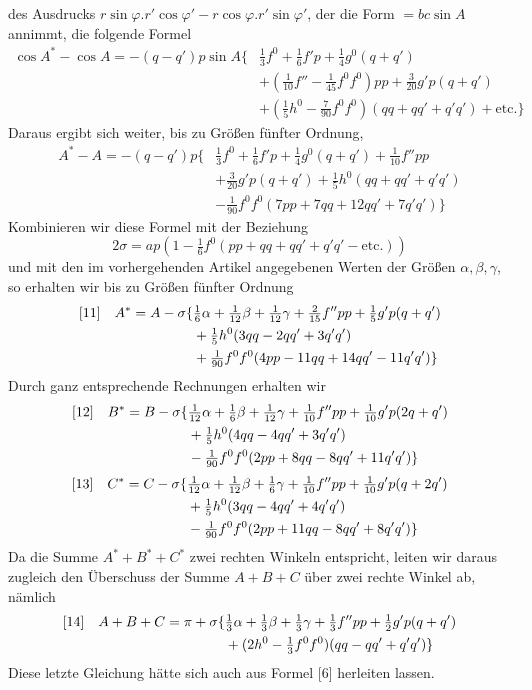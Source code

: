 %
des Ausdrucks \(r\sin\varphi\mathord{.}r'\cos\varphi'-r\cos\varphi\mathord{.}r'\sin\varphi'\), der die Form \(=bc\sin A\) annimmt, die folgende Formel
\[
\begin{aligned}
\cos A^*-\cos A=-(q-q')p\sin A\{&\tfrac{1}{3}f^0+\tfrac{1}{6}f'p+\tfrac{1}{4}g^0(q+q')\\
&+(\tfrac{1}{10}f''-\tfrac{1}{45}f^0f^0)pp+\tfrac{3}{20}g'p(q+q')\\
&+(\tfrac{1}{5}h^0-\tfrac{7}{90}f^0f^0)(qq+qq'+q'q')+\text{etc.}\}
\end{aligned}
\]
Daraus ergibt sich weiter, bis zu Größen fünfter Ordnung,
\[
\begin{aligned}
A^*-A=-(q-q')p\{&\tfrac{1}{3}f^0+\tfrac{1}{6}f'p+\tfrac{1}{4}g^0(q+q')+\tfrac{1}{10}f''pp\\
&+\tfrac{3}{20}g'p(q+q')+\tfrac{1}{5}h^0(qq+qq'+q'q')\\
&-\tfrac{1}{90}f^0f^0(7pp+7qq+12qq'+7q'q')\}
\end{aligned}
\]
Kombinieren wir diese Formel mit der Beziehung
\[
2\sigma=ap(1-\tfrac{1}{6}f^0(pp+qq+qq'+q'q'-\text{etc.}))
\]
und mit den im vorhergehenden Artikel angegebenen Werten der Größen \(\alpha,\beta,\gamma\), so erhalten wir bis zu Größen fünfter Ordnung
\[
\begin{aligned}
\relax[11]\quad A^*=A-\sigma\{&\tfrac{1}{6}\alpha+\tfrac{1}{12}\beta+\tfrac{1}{12}\gamma+\tfrac{2}{15}f''pp+\tfrac{1}{5}g'p(q+q')\\
&+\tfrac{1}{5}h^0(3qq-2qq'+3q'q')\\
&+\tfrac{1}{90}f^0f^0(4pp-11qq+14qq'-11q'q')\}
\end{aligned}
\]
Durch ganz entsprechende Rechnungen erhalten wir
\[
\begin{aligned}
\relax[12]\quad B^*=B-\sigma\{&\tfrac{1}{12}\alpha+\tfrac{1}{6}\beta+\tfrac{1}{12}\gamma+\tfrac{1}{10}f''pp+\tfrac{1}{10}g'p(2q+q')\\
&+\tfrac{1}{5}h^0(4qq-4qq'+3q'q')\\
&-\tfrac{1}{90}f^0f^0(2pp+8qq-8qq'+11q'q')\}
\end{aligned}
\]
\[
\begin{aligned}
\relax[13]\quad C^*=C-\sigma\{&\tfrac{1}{12}\alpha+\tfrac{1}{12}\beta+\tfrac{1}{6}\gamma+\tfrac{1}{10}f''pp+\tfrac{1}{10}g'p(q+2q')\\
&+\tfrac{1}{5}h^0(3qq-4qq'+4q'q')\\
&-\tfrac{1}{90}f^0f^0(2pp+11qq-8qq'+8q'q')\}
\end{aligned}
\]
Da die Summe \(A^*+B^*+C^*\) zwei rechten Winkeln entspricht, leiten wir daraus zugleich den Überschuss der Summe \(A+B+C\) über zwei rechte Winkel ab, nämlich
\[
\begin{aligned}
\relax[14]\quad A+B+C=\pi+\sigma\{&\tfrac{1}{3}\alpha+\tfrac{1}{3}\beta+\tfrac{1}{3}\gamma+\tfrac{1}{3}f''pp+\tfrac{1}{2}g'p(q+q')\\
&+(2h^0-\tfrac{1}{3}f^0f^0)(qq-qq'+q'q')\}
\end{aligned}
\]
Diese letzte Gleichung hätte sich auch aus Formel [6] herleiten lassen.
